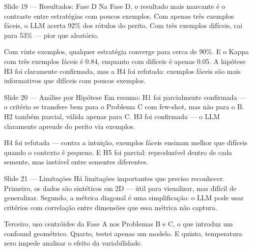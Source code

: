 \documentclass[aspectratio=169, 14pt]{beamer}
\begin{document}
\begin{frame}{Slide 19 — Resultados: Fase D}
  Na Fase D, o resultado mais marcante é o contraste entre estratégias com poucos exemplos. Com apenas três exemplos fáceis, o LLM acerta 92\% dos rótulos do perito. Com três exemplos difíceis, cai para 53\% — pior que aleatório.

  Com vinte exemplos, qualquer estratégia converge para cerca de 90\%. E o Kappa com três exemplos fáceis é 0.84, enquanto com difíceis é apenas 0.05. A hipótese H3 foi claramente confirmada, mas a H4 foi refutada: exemplos fáceis são mais informativos que difíceis com poucos exemplos.
\end{frame}

\begin{frame}{Slide 20 — Análise por Hipótese}
  Em resumo: H1 foi parcialmente confirmada — o critério se transfere bem para o Problema C com few-shot, mas não para o B. H2 também parcial, válida apenas para C. H3 foi confirmada — o LLM claramente aprende do perito via exemplos.

  H4 foi refutada — contra a intuição, exemplos fáceis ensinam melhor que difíceis quando o contexto é pequeno. E H5 foi parcial: reproduzível dentro de cada semente, mas instável entre sementes diferentes.
\end{frame}

\begin{frame}{Slide 21 — Limitações}
  Há limitações importantes que preciso reconhecer. Primeiro, os dados são sintéticos em 2D — útil para visualizar, mas difícil de generalizar. Segundo, a métrica diagonal é uma simplificação: o LLM pode usar critérios com correlação entre dimensões que essa métrica não captura.

  Terceiro, uso centróides da Fase A nos Problemas B e C, o que introduz um confound geométrico. Quarto, testei apenas um modelo. E quinto, temperatura zero impede analisar o efeito da variabilidade.
\end{frame}
\end{document}
